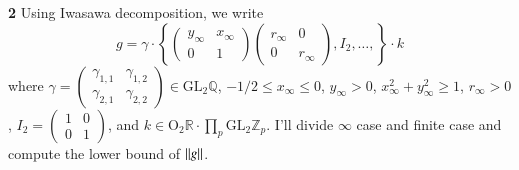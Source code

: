 \documentclass[a4paper, 12pt]{article}
\theoremstyle{Mydefinition}
\theoremstyle{Mytheorem}
\begin{document}
\noindent \textbf{2}
Using Iwasawa decomposition, we write
\begin{equation}
    g = \gamma \cdot \left\{\begin{pmatrix}
    y_\infty & x_\infty \\
    0 & 1
    \end{pmatrix}\begin{pmatrix}
    r_\infty & 0 \\
    0 & r_\infty
    \end{pmatrix}, I_2, \ldots, \right\}\cdot k
\end{equation}
where $\gamma=\begin{pmatrix}
    \gamma_{1,1} & \gamma_{1,2}\\
    \gamma_{2,1} & \gamma_{2,2}
    \end{pmatrix}\in \mathrm{GL}_2\mathbb{Q}$, $-1/2\leq x_\infty\leq 0$, $y_\infty>0$, $x_\infty^2+y_\infty^2\geq 1$, $r_\infty>0$, $I_2 = \begin{pmatrix}
1 & 0\\
0 & 1
\end{pmatrix}$, and $k\in \mathrm{O}_2\mathbb{R}\cdot \prod_p \mathrm{GL}_2\mathbb{Z}_p$.
I'll divide $\infty$ case and finite case and compute the lower bound of $\norm{g}$.
\end{document}

